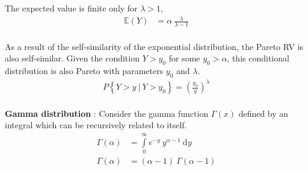 \begin{figure}[H]
\end{figure}

The expected value is finite only for $ \lambda > 1 $, \\

\begin{align}
	\mathbb{E}(Y) &= \alpha \ \frac{\lambda}{\lambda - 1 }
\end{align} \\

As a result of the self-similarity of the exponential distribution, the Pareto RV is also self-similar. Given the condition $ Y > y_0 $ for some $ y_0 > \alpha $, this conditional distribution is also Pareto with parameters $ y_0 $ and $ \lambda $.\\

\begin{align}
	P \left\{Y > y\ |\ Y > y_0 \right\} = \left(\frac{y_0}{y}\right)^\lambda
\end{align}\\

\textbf{Gamma distribution} : Consider the gamma function $ \Gamma(x) $ defined by an integral which can be recursively related to itself.\\

\begin{align}
	\Gamma(\alpha) &= \int\limits_{0}^{\infty} e^{-y}\ y^{\alpha -1}\ \mathrm{d}y \\[1ex]
	\Gamma(\alpha) &= (\alpha - 1)\ \Gamma(\alpha - 1)
\end{align}\\

